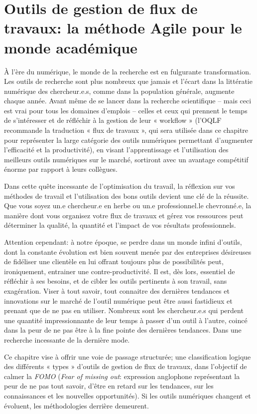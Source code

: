 \documentclass[
  letterpaper,
  DIV=11,
  numbers=noendperiod]{scrreprt}
\begin{document}
\chapter{Outils de gestion de flux de travaux: la méthode Agile pour le
monde académique}\label{sec-chap3}

À l'ère du numérique, le monde de la recherche est en fulgurante
transformation. Les outils de recherche sont plus nombreux que jamais et
l'écart dans la littératie numérique des chercheur.e.s, comme dans la
population générale, augmente chaque année. Avant même de se lancer dans
la recherche scientifique -- mais ceci est vrai pour tous les domaines
d'emplois -- celles et ceux qui prennent le temps de s'intéresser et de
réfléchir à la gestion de leur « workflow » (l'OQLF recommande la
traduction « flux de travaux », qui sera utilisée dans ce chapitre pour
représenter la large catégorie des outils numériques permettant
d'augmenter l'efficacité et la productivité), en visant l'apprentissage
et l'utilisation des meilleurs outils numériques sur le marché,
sortiront avec un avantage compétitif énorme par rapport à leurs
collègues.

Dans cette quête incessante de l'optimisation du travail, la réflexion
sur vos méthodes de travail et l'utilisation des bons outils devient une
clé de la réussite. Que vous soyez un.e chercheur.e en herbe ou un.e
professionnel.le chevronné.e, la manière dont vous organisez votre flux
de travaux et gérez vos ressources peut déterminer la qualité, la
quantité et l'impact de vos résultats professionnels.

Attention cependant: à notre époque, se perdre dans un monde infini
d'outils, dont la constante évolution est bien souvent menée par des
entreprises désireuses de fidéliser une clientèle en lui offrant
toujours plus de possibilités peut, ironiquement, entrainer une
contre-productivité. Il est, dès lors, essentiel de réfléchir à ses
besoins, et de cibler les outils pertinents à son travail, sans
exagération. Viser à tout savoir, tout connaitre des dernières tendances
et innovations sur le marché de l'outil numérique peut être aussi
fastidieux et prenant que de ne pas en utiliser. Nombreux sont les
chercheur.e.s qui perdent une quantité impressionnante de leur temps à
passer d'un outil à l'autre, coincé dans la peur de ne pas être à la
fine pointe des dernières tendances. Dans une recherche incessante de la
dernière mode.

Ce chapitre vise à offrir une voie de passage structurée; une
classification logique des différents « types » d'outils de gestion de
flux de travaux, dans l'objectif de calmer la \emph{FOMO} (\emph{Fear of
missing out}: expression anglophone représentant la peur de ne pas tout
savoir, d'être en retard sur les tendances, sur les connaissances et les
nouvelles opportunités). Si les outils numériques changent et évoluent,
les méthodologies derrière demeurent.
\end{document}
